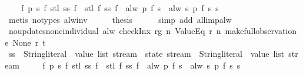 \begin{isabellebody}
\ \ \ \ {\isachardoublequoteopen}{\isasymforall}f\ p\ s{\isachardot}\ f\ {\isacharparenleft}stl\ {\isacharparenleft}ss\ f{\isacharparenright}{\isacharparenright}\ {\isasymnoteq}\ stl\ {\isacharparenleft}f\ {\isacharparenleft}ss\ f{\isacharparenright}{\isacharparenright}\ {\isasymor}\ alw\ p\ {\isacharparenleft}f\ s{\isacharparenright}\ {\isacharequal}\ alw\ {\isacharparenleft}{\isasymlambda}s{\isachardot}\ p\ {\isacharparenleft}f\ s{\isacharparenright}{\isacharparenright}\ s{\isachardoublequoteclose}\isanewline
\ \ \ \ \isamarkupfalse%
\ {\isacharparenleft}metis\ {\isacharparenleft}no{\isacharunderscore}types{\isacharparenright}\ alw{\isacharunderscore}inv{\isacharparenright}\isanewline
\ \ \isamarkupfalse%
\ \isamarkupfalse%
\ {\isacharquery}thesis\isanewline
\ \ \ \ \isamarkupfalse%
\ {\isacharparenleft}simp\ add{\isacharcolon}\ all{\isacharunderscore}imp{\isacharunderscore}alw{\isacharparenright}\isanewline
{}\isamarkupfalse%
%
\endisatagproof
{\isafoldproof}%
%
\isadelimproof
\isanewline
%
\endisadelimproof
\isanewline
{}\isamarkupfalse%
\ no{\isacharunderscore}updates{\isacharunderscore}none{\isacharunderscore}individual{\isacharcolon}\ {\isachardoublequoteopen}alw\ {\isacharparenleft}checkInx\ rg\ n\ ValueEq\ {\isacharparenleft}r\ n{\isacharparenright}{\isacharparenright}\ {\isacharparenleft}make{\isacharunderscore}full{\isacharunderscore}observation\ e\ None\ r\ t{\isacharparenright}{\isachardoublequoteclose}\isanewline
%
\isadelimproof
%
\endisadelimproof
%
\isatagproof
{}\isamarkupfalse%
\ {\isacharminus}\isanewline
\ \ \isamarkupfalse%
\ ss\ {\isacharcolon}{\isacharcolon}\ {\isachardoublequoteopen}{\isacharparenleft}{\isacharparenleft}String{\isachardot}literal\ {\isasymtimes}\ value\ list{\isacharparenright}\ stream\ {\isasymRightarrow}\ state\ stream{\isacharparenright}\ {\isasymRightarrow}\ {\isacharparenleft}String{\isachardot}literal\ {\isasymtimes}\ value\ list{\isacharparenright}\ stream{\isachardoublequoteclose}\ \isanewline
\ \ \ \ {\isachardoublequoteopen}{\isasymforall}f\ p\ s{\isachardot}\ f\ {\isacharparenleft}stl\ {\isacharparenleft}ss\ f{\isacharparenright}{\isacharparenright}\ {\isasymnoteq}\ stl\ {\isacharparenleft}f\ {\isacharparenleft}ss\ f{\isacharparenright}{\isacharparenright}\ {\isasymor}\ alw\ p\ {\isacharparenleft}f\ s{\isacharparenright}\ {\isacharequal}\ alw\ {\isacharparenleft}{\isasymlambda}s{\isachardot}\ p\ {\isacharparenleft}f\ s{\isacharparenright}{\isacharparenright}\ s{\isachardoublequoteclose}\isanewline

\end{isabellebody}
